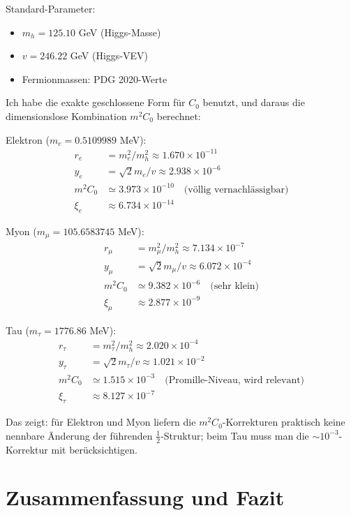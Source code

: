 \documentclass[12pt,a4paper]{article}
\theoremstyle{definition}
\begin{document}
	\begin{numerisch}
		Standard-Parameter:
		\begin{itemize}
			\item $m_h = 125.10$ GeV (Higgs-Masse)
			\item $v = 246.22$ GeV (Higgs-VEV)
			\item Fermionmassen: PDG 2020-Werte
		\end{itemize}
		
		Ich habe die exakte geschlossene Form für $C_0$ benutzt, und daraus die dimensionslose Kombination $m^2C_0$ berechnet:
		
		Elektron ($m_e = 0.5109989$ MeV):
		\begin{align}
			r_e &= m_e^2/m_h^2 \approx 1.670 \times 10^{-11}\\
			y_e &= \sqrt{2} m_e/v \approx 2.938 \times 10^{-6}\\
			m^2C_0 &\simeq 3.973 \times 10^{-10} \quad \text{(völlig vernachlässigbar)}\\
			\xi_e &\approx 6.734 \times 10^{-14}
		\end{align}
		
		Myon ($m_\mu = 105.6583745$ MeV):
		\begin{align}
			r_\mu &= m_\mu^2/m_h^2 \approx 7.134 \times 10^{-7}\\
			y_\mu &= \sqrt{2} m_\mu/v \approx 6.072 \times 10^{-4}\\
			m^2C_0 &\simeq 9.382 \times 10^{-6} \quad \text{(sehr klein)}\\
			\xi_\mu &\approx 2.877 \times 10^{-9}
		\end{align}
		
		Tau ($m_\tau = 1776.86$ MeV):
		\begin{align}
			r_\tau &= m_\tau^2/m_h^2 \approx 2.020 \times 10^{-4}\\
			y_\tau &= \sqrt{2} m_\tau/v \approx 1.021 \times 10^{-2}\\
			m^2C_0 &\simeq 1.515 \times 10^{-3} \quad \text{(Promille-Niveau, wird relevant)}\\
			\xi_\tau &\approx 8.127 \times 10^{-7}
		\end{align}
		
		Das zeigt: für Elektron und Myon liefern die $m^2C_0$-Korrekturen praktisch keine nennbare Änderung der führenden $\frac{1}{2}$-Struktur; beim Tau muss man die $\sim 10^{-3}$-Korrektur mit berücksichtigen.
	\end{numerisch}
	

	\section{Zusammenfassung und Fazit}
	
\end{document}
